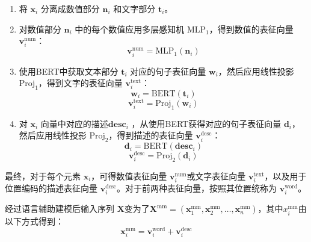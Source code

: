 \begin{enumerate}
    \item 将 $\mathbf{x}_i$ 分离成数值部分 $\mathbf{n}_i$ 和文字部分 $\mathbf{t}_i$。
    \item 对数值部分 $\mathbf{n}_i$ 中的每个数值应用多层感知机 ${\mathrm{MLP}}_1$，得到数值的表征向量 $\mathbf{v}_i^{\mathrm{num}}$：
    \begin{equation}
    \mathbf{v}_i^{\mathrm{num}} = {\mathrm{MLP}}_1(\mathbf{n}_i)
    \end{equation}
    \item 使用BERT中获取文本部分 $\mathbf{t}_i$ 对应的句子表征向量 $\mathbf{w}_i$，然后应用线性投影 ${\mathrm{Proj}}_1$，得到文字的表征向量 $\mathbf{v}_i^{\mathrm{text}}$：
    \begin{equation}
    \mathbf{w}_i = {\mathrm{BERT}}(\mathbf{t}_i)
    \end{equation}
    \begin{equation}
    \mathbf{v}_i^{\mathrm{text}} = {\mathrm{Proj}}_1(\mathbf{w}_i)
    \end{equation}
    \item 对 $\mathbf{x}_i$ 向量中对应的描述$\mathbf{desc}_i$ ，从使用BERT获得对应的句子表征向量 $\mathbf{d}_i$，然后应用线性投影 ${\mathrm{Proj}}_2$，得到描述的表征向量 $\mathbf{v}_i^{\mathrm{desc}}$：
    \begin{equation}
    \mathbf{d}_i = {\mathrm{BERT}}(\mathbf{desc}_i)
    \end{equation}
    \begin{equation}
    \mathbf{v}_i^{\mathrm{desc}} = {\mathrm{Proj}}_2(\mathbf{d}_i)
    \end{equation}
    
\end{enumerate}

最终，对于每个元素 $\mathbf{x}_i$，可得数值表征向量 $\mathbf{v}_i^{\mathrm{num}}$或文字表征向量 $\mathbf{v}_i^{\mathrm{text}}$，以及用于位置编码的描述表征向量 $\mathbf{v}_i^{\mathrm{desc}}$。对于前两种表征向量，按照其位置统称为 $\mathbf{v}_i^{\mathrm{word}}$。

经过语言辅助建模后输入序列 $ \mathbf{X}$变为了$ \mathbf{X}^{\mathrm{mm}} = (\mathbf{x}_1^{\mathrm{mm}}, \mathbf{x}_2^{\mathrm{mm}}, \ldots, \mathbf{x}_n^{\mathrm{mm}}) $，其中${x}_i^{\mathrm{mm}}$由以下方式得到：
    \begin{equation}
    \mathbf{x}_i^{\mathrm{mm}} = \mathbf{v}_i^{\mathrm{word}} + \mathbf{v}_i^{\mathrm{desc}}
    \end{equation}
   
